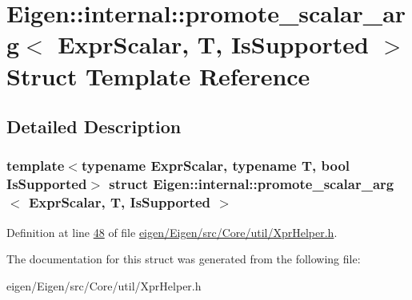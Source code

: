 \hypertarget{struct_eigen_1_1internal_1_1promote__scalar__arg}{}\section{Eigen\+:\+:internal\+:\+:promote\+\_\+scalar\+\_\+arg$<$ Expr\+Scalar, T, Is\+Supported $>$ Struct Template Reference}
\label{struct_eigen_1_1internal_1_1promote__scalar__arg}


\subsection{Detailed Description}
\subsubsection*{template$<$typename Expr\+Scalar, typename T, bool Is\+Supported$>$\newline
struct Eigen\+::internal\+::promote\+\_\+scalar\+\_\+arg$<$ Expr\+Scalar, T, Is\+Supported $>$}



Definition at line \hyperlink{eigen_2_eigen_2src_2_core_2util_2_xpr_helper_8h_source_l00048}{48} of file \hyperlink{eigen_2_eigen_2src_2_core_2util_2_xpr_helper_8h_source}{eigen/\+Eigen/src/\+Core/util/\+Xpr\+Helper.\+h}.



The documentation for this struct was generated from the following file\+:\begin{DoxyCompactItemize}
\item 
eigen/\+Eigen/src/\+Core/util/\+Xpr\+Helper.\+h\end{DoxyCompactItemize}
